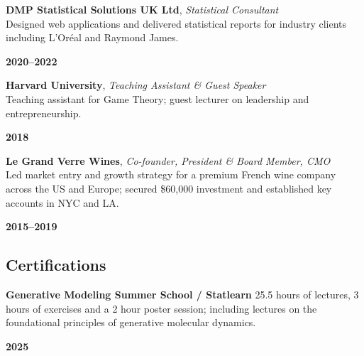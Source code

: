 \documentclass[
]{article}
\begin{document}
\noindent
\begin{minipage}[t]{0.85\textwidth}
\textbf{DMP Statistical Solutions UK Ltd}, \emph{Statistical Consultant}\\
Designed web applications and delivered statistical reports for industry clients including L'Oréal and Raymond James.
\end{minipage}%
\hfill
\begin{minipage}[t]{0.15\textwidth}
\raggedleft \textbf{2020--2022}
\end{minipage}

\vspace{0.6em}

\noindent
\begin{minipage}[t]{0.85\textwidth}
\textbf{Harvard University}, \emph{Teaching Assistant \& Guest Speaker}\\
Teaching assistant for Game Theory; guest lecturer on leadership and entrepreneurship.
\end{minipage}%
\hfill
\begin{minipage}[t]{0.15\textwidth}
\raggedleft \textbf{2018}
\end{minipage}

\vspace{0.6em}

\noindent
\begin{minipage}[t]{0.85\textwidth}
\textbf{Le Grand Verre Wines}, \emph{Co-founder, President \& Board Member, CMO}\\
Led market entry and growth strategy for a premium French wine company across the US and Europe; secured \$60,000 investment and established key accounts in NYC and LA.
\end{minipage}%
\hfill
\begin{minipage}[t]{0.15\textwidth}
\raggedleft \textbf{2015--2019}
\end{minipage}

\subsection{Certifications}\label{certifications}

\noindent
\begin{minipage}[t]{0.85\textwidth}
\textbf{Generative Modeling Summer School / Statlearn}
25.5 hours of lectures, 3 hours of exercises and a 2 hour poster session; including lectures on the foundational principles of generative molecular dynamics.\\
\end{minipage}%
\hfill
\begin{minipage}[t]{0.15\textwidth}
\raggedleft \textbf{2025}
\end{minipage}
\end{document}
